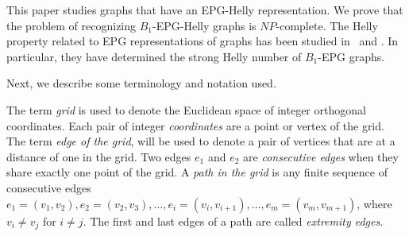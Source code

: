 \documentclass[runningheads]{llncs}
\begin{document}
%






This paper studies graphs that have an EPG-Helly representation. We prove that the problem of recognizing $ B_1$-EPG-Helly graphs is $NP$-complete.   The Helly property related to EPG representations of graphs has been studied in~\cite{golumbic2009} and \cite{golumbic2013}. In particular, they have determined the strong Helly number of $B_1$-EPG graphs. 


 
 
 Next, we describe some terminology and notation used.


The term \emph{grid} is used to denote the Euclidean space of integer orthogonal coordinates. Each pair of integer \emph{coordinates} are a point or vertex of the grid. The term \emph{edge of the grid}, will be used to denote a pair of vertices that are at a distance of one in the grid. Two edges $e_1$ and $e_2$ are \emph{consecutive edges} when they share exactly one point of the grid. %
 A \emph{path in the grid} is any finite sequence of consecutive edges $e_1 = (v_1, v_{2}), e_2 = (v_2, v_{3}), \dots, e_i = (v_i, v_{i+1}), \dots, e_m = (v_{m}, v_{m+1})$, where $v_i \neq v_j$ for $i \neq j$. %
 The first and last edges of a path are called \emph{extremity edges}.
 
\end{document}
